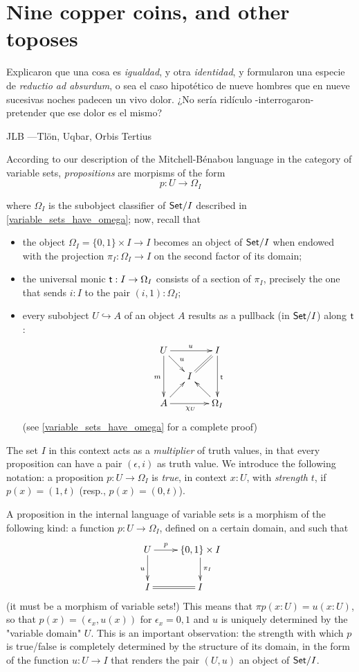 \section{Nine copper coins, and other toposes}\label{sec_coins}
\epigraph{
	Explicaron que una cosa es \emph{igualdad}, y otra \emph{identidad}, y formularon una especie de \emph{reductio ad absurdum}, o sea el caso hipotético de nueve hombres que en nueve sucesivas noches padecen un vivo dolor. ¿No sería ridículo -interrogaron- pretender que ese dolor es el mismo?
}{JLB ---Tl\"on, Uqbar, Orbis Tertius}

According to our description of the Mitchell-Bénabou language in the category of variable sets, \emph{propositions} are morpisms of the form
\[p : U \to \Omega_I\]

where $\Omega_I$ is the subobject classifier of $\mathsf{Set}/I$ described in \autoref{variable_sets_have_omega}; now, recall that
\begin{itemize}
	\item the object $\Omega_I = \{0,1\}\times I \to I$ becomes an object of $\mathsf{Set}/I$ when endowed with the projection $\pi_I : \Omega_I \to I$ on the second factor of its domain;
	\item the universal monic $\textsf{t} : I \to \Omega_I$ consists of a section of $\pi_I$, precisely the one that sends $i : I$ to the pair $(i,1) : \Omega_I$;
	\item every subobject $U \hookrightarrow A$ of an object $A$ results as a pullback (in $\mathsf{Set}/I$) along $\textsf{t}$:
	      \[\xymatrix@R=5mm@C=5mm{
		      U\ar[dr]^u\ar[rr]^u\ar[dd]_m&& I\ar[dd]^{\tr} \ar@{=}[dl]\\
		      &I& \\
		      A \ar[ur]\ar[rr]_{\chi_U}&& \ar[ul]\Omega_I
		      }\]
	      (see \autoref{variable_sets_have_omega} for a complete proof)
\end{itemize}
The set $I$ in this context acts as a \emph{multiplier} of truth values, in that every proposition can have a pair $(\epsilon, i)$ as truth value. We introduce the following notation: a proposition $p : U \to \Omega_I$ is \emph{true}, in context $x :U$, with \emph{strength} $t$, if $p(x) =(1,t)$ (resp., $p(x)=(0,t)$).
\begin{remark}\label{very_importanta_force}
	A proposition in the internal language of variable sets is a morphism of the following kind: a function $p : U \to \Omega_I$, defined on a certain domain, and such that
	\[
		\xymatrix{
			U\ar[d]_u\ar[r]^-p  & \{0,1\}\times I \ar[d]^{\pi_I}\\
			I \ar@{=}[r]& I
		}
	\]
	(it must be a morphism of variable sets!) This means that $\pi p(x : U) = u(x : U)$, so that $p(x) = (\epsilon_x, u(x))$ for $\epsilon_x =0,1$ and $u$ is uniquely determined by the "variable domain" $U$. This is an important observation: the strength with which $p$ is true/false is completely determined by the structure of its domain, in the form of the function $u : U \to I$ that renders the pair $(U,u)$ an object of $\mathsf{Set}/I$.
\end{remark}
